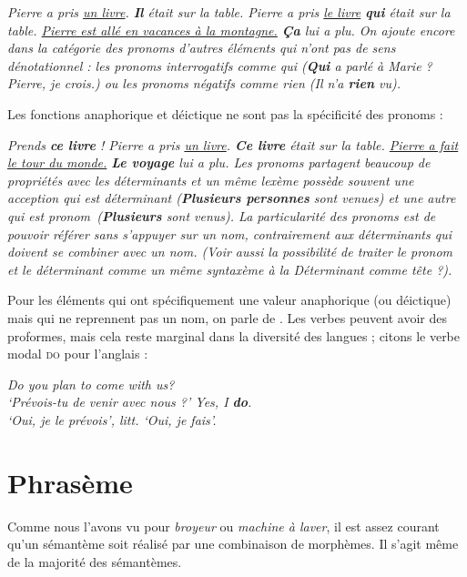 {\ea
  \ea \itshape Pierre a pris \uline{un livre}. \textbf{Il}  était sur la table.
  \ex \itshape Pierre a pris \uline{le livre} \textbf{qui}  était sur la table.
  \ex \itshape \uline{Pierre est allé en vacances à la montagne.} \textbf{Ça} lui a plu.
  \z
\z
    On ajoute encore dans la catégorie des pronoms d’autres éléments qui n’ont pas de sens dénotationnel : les pronoms interrogatifs comme \textit{qui} (\textbf{\textit{Qui}} \textit{a parlé à Marie} ? \textit{Pierre, je crois.)} ou les pronoms négatifs comme \textit{rien} (\textit{Il n’a} \textbf{\textit{rien}} \textit{vu}).\textbf{ }

    Les fonctions anaphorique et déictique ne sont pas la spécificité des pronoms :
    
\ea
  \ea \itshape Prends \textbf{ce livre} !
  \ex \itshape Pierre a pris \uline{un livre}. \textbf{Ce livre}  était sur la table.
  \ex \itshape \uline{Pierre a fait le tour du monde.} \textbf{Le voyage}  lui a plu.
  \z
\z
    Les pronoms partagent beaucoup de propriétés avec les déterminants et un même lexème possède souvent une acception qui est déterminant (\textbf{\textit{Plusieurs personnes}} \textit{sont venues}) et une autre qui est pronom~(\textbf{\textit{Plusieurs}} \textit{sont venus}). La particularité des pronoms est de pouvoir référer sans s’appuyer sur un nom, contrairement aux déterminants qui doivent se combiner avec un nom. (Voir aussi la possibilité de traiter le pronom et le déterminant comme un même syntaxème à la  \textit{Déterminant comme tête} ?).

    Pour les éléments qui ont spécifiquement une valeur anaphorique (ou déictique) mais qui ne reprennent pas un nom, on parle de . Les verbes peuvent avoir des proformes, mais cela reste marginal dans la diversité des langues ; citons le verbe modal \textsc{do} pour l’anglais :
    
\ea 
  \ea \itshape Do you plan to come with us?\\
  \glt   ‘Prévois-tu de venir avec nous ?’
  \ex \itshape Yes, I \textbf{do}.\\
  \glt   ‘Oui, je le prévois’, litt. ‘Oui, je fais’.
  \z
\z
}
\section{Phrasème}\label{sec:2.3.7}

Comme nous l’avons vu pour \textit{broyeur} ou \textit{machine à laver}, il est assez courant qu’un sémantème soit réalisé par une combinaison de morphèmes. Il s’agit même de la majorité des sémantèmes.


